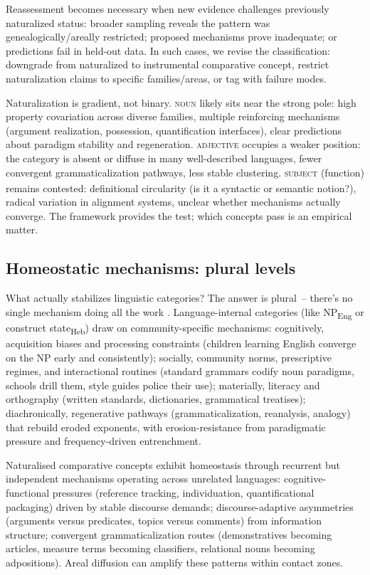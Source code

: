 \documentclass[12pt]{article}
\begin{document}
Reassessment becomes necessary when new evidence challenges previously naturalized status: broader sampling reveals the pattern was genealogically/areally restricted; proposed mechanisms prove inadequate; or predictions fail in held-out data. In such cases, we revise the classification: downgrade from naturalized to instrumental comparative concept, restrict naturalization claims to specific families/areas, or tag with failure modes.

Naturalization is gradient, not binary. \textsc{noun} likely sits near the strong pole: high property covariation across diverse families, multiple reinforcing mechanisms (argument realization, possession, quantification interfaces), clear predictions about paradigm stability and regeneration. \textsc{adjective} occupies a weaker position: the category is absent or diffuse in many well-described languages, fewer convergent grammaticalization pathways, less stable clustering. \textsc{subject}\textsubscript{\Cross} (function) remains contested: definitional circularity (is it a syntactic or semantic notion?), radical variation in alignment systems, unclear whether mechanisms actually converge. The framework provides the test; which concepts pass is an empirical matter.

\subsection{Homeostatic mechanisms: plural levels}\label{subsec:mechanisms}
What actually stabilizes linguistic categories? The answer is plural~-- there's no single mechanism doing all the work \parencite[cf.][]{Miller2021}. Language-internal categories (like NP\textsubscript{Eng} or construct state\textsubscript{Heb}) draw on community-specific mechanisms: cognitively, acquisition biases and processing constraints (children learning English converge on the NP early and consistently); socially, community norms, prescriptive regimes, and interactional routines (standard grammars codify noun paradigms, schools drill them, style guides police their use); materially, literacy and orthography (written standards, dictionaries, grammatical treatises); diachronically, regenerative pathways (grammaticalization, reanalysis, analogy) that rebuild eroded exponents, with erosion-resistance from paradigmatic pressure and frequency-driven entrenchment.

Naturalised comparative concepts exhibit homeostasis through recurrent but independent mechanisms operating across unrelated languages: cognitive-functional pressures (reference tracking, individuation, quantificational packaging) driven by stable discourse demands; discourse-adaptive asymmetries (arguments versus predicates, topics versus comments) from information structure; convergent grammaticalization routes (demonstratives becoming articles, measure terms becoming classifiers, relational nouns becoming adpositions). Areal diffusion can amplify these patterns within contact zones.
\end{document}
